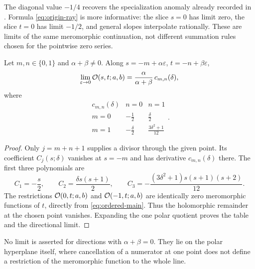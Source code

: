 The diagonal value $-1/4$ recovers the specialization anomaly already
recorded in \cite{repo:finite}. Formula \eqref{eq:origin-ray} is more
informative: the slice $s=0$ has limit zero, the slice $t=0$ has limit
$-1/2$, and general slopes interpolate rationally. These are limits
of the same meromorphic continuation, not different summation rules
chosen for the pointwise zero series.

\begin{theorem}\label{thm:zero-table}
Let $m,n\in\{0,1\}$ and $\alpha+\beta\ne0$. Along
$s=-m+\alpha\varepsilon$, $t=-n+\beta\varepsilon$,
\begin{equation}\label{eq:zero-ray}
 \lim_{\varepsilon\to0}\mathcal O(s,t;a,b)
       =\frac{\alpha}{\alpha+\beta}\,c_{m,n}(\delta),
\end{equation}
where
\begin{equation}\label{eq:zero-table}
 \begin{array}{c|cc}
 c_{m,n}(\delta)&n=0&n=1\\\hline
 m=0&-\tfrac12&\tfrac{\delta}{2}\\[2pt]
 m=1&-\tfrac{\delta}{2}&\tfrac{3\delta^2+1}{12}
 \end{array}.
\end{equation}
\end{theorem}
\begin{proof}
Only $j=m+n+1$ supplies a divisor through the given point.
Its coefficient $C_j(s;\delta)$ vanishes at $s=-m$ and has
derivative $c_{m,n}(\delta)$ there. The first three polynomials are
\[
 C_1=-\frac s2,\qquad
 C_2=\frac{\delta s(s+1)}2,\qquad
 C_3=-\frac{(3\delta^2+1)s(s+1)(s+2)}{12}.
\]
The restrictions $\mathcal O(0,t;a,b)$ and $\mathcal O(-1,t;a,b)$ are
identically zero meromorphic functions of $t$, directly from
\eqref{eq:ordered-main}. Thus the holomorphic remainder at the
chosen point vanishes. Expanding the one polar quotient proves
the table and the directional limit.
\end{proof}

No limit is asserted for directions with $\alpha+\beta=0$.
They lie on the polar hyperplane itself, where cancellation of a
numerator at one point does not define a restriction of the
meromorphic function to the whole line.
